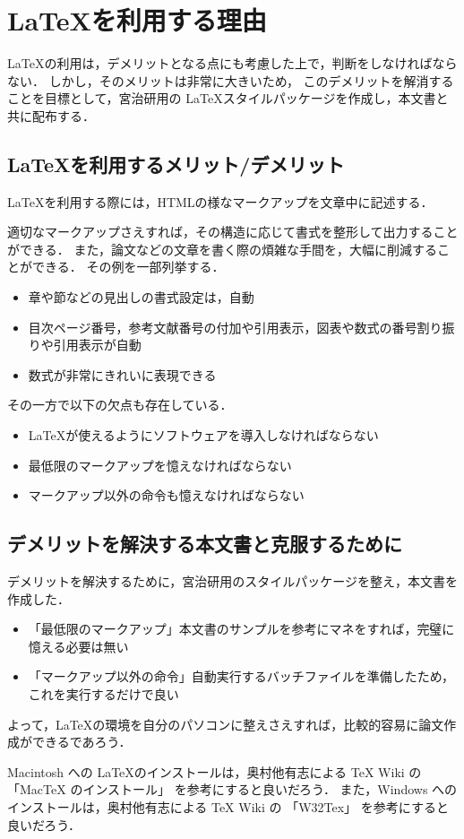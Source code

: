 \section{\LaTeX を利用する理由}
\LaTeX の利用は，デメリットとなる点にも考慮した上で，判断をしなければならない．
しかし，そのメリットは非常に大きいため，
このデメリットを解消することを目標として，宮治研用の \LaTeX スタイルパッケージを作成し，本文書と共に配布する．


\subsection{\LaTeX を利用するメリット/デメリット}

\LaTeX を利用する際には，HTMLの様なマークアップを文章中に記述する．

適切なマークアップさえすれば，その構造に応じて書式を整形して出力することができる．
また，論文などの文章を書く際の煩雑な手間を，大幅に削減することができる．
その例を一部列挙する．
\begin{itemize}
\item 章や節などの見出しの書式設定は，自動
\item 目次ページ番号，参考文献番号の付加や引用表示，図表や数式の番号割り振りや引用表示が自動
\item 数式が非常にきれいに表現できる
\end{itemize}

その一方で以下の欠点も存在している．
\begin{itemize}
\item \LaTeX が使えるようにソフトウェアを導入しなければならない
\item 最低限のマークアップを憶えなければならない
\item マークアップ以外の命令も憶えなければならない
\end{itemize}


\subsection{デメリットを解決する本文書と克服するために}
デメリットを解決するために，宮治研用のスタイルパッケージを整え，本文書を作成した．

\begin{itemize}
\item 「最低限のマークアップ」本文書のサンプルを参考にマネをすれば，完璧に憶える必要は無い
\item 「マークアップ以外の命令」自動実行するバッチファイルを準備したため，これを実行するだけで良い
\end{itemize}

よって，\LaTeX の環境を自分のパソコンに整えさえすれば，比較的容易に論文作成ができるであろう．

Macintosh への \LaTeX のインストールは，奥村他有志による TeX Wiki の 「MacTeX のインストール」\cite{mactex} を参考にすると良いだろう．
また，Windows へのインストールは，奥村他有志による TeX Wiki の 「W32Tex」\cite{w32tex} を参考にすると良いだろう．